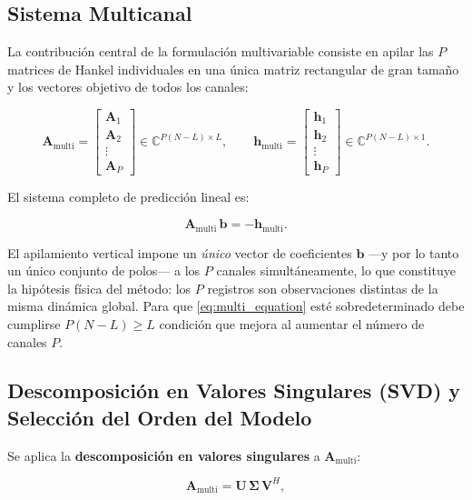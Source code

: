 \subsection{Sistema  Multicanal}
\label{subsec:Sis_Mul}
La contribución central de la formulación multivariable consiste en apilar las 
$P$ matrices de Hankel individuales en una única matriz rectangular de gran tamaño y
los vectores objetivo de todos los canales:

\begin{equation}
\mathbf{A}_{\text{multi}} =
\begin{bmatrix} \mathbf{A}_1 \\ \mathbf{A}_2 \\ \vdots \\ \mathbf{A}_P \end{bmatrix}
\in \mathbb{C}^{P(N-L)\times L},
\qquad
\mathbf{h}_{\text{multi}} =
\begin{bmatrix} \mathbf{h}_1 \\ \mathbf{h}_2 \\ \vdots \\ \mathbf{h}_P \end{bmatrix}
\in \mathbb{C}^{P(N-L)\times 1}.
\label{eq:multi_system}
\end{equation}

El sistema completo de predicción lineal es:

\begin{equation}
\boxed{\mathbf{A}_{\text{multi}}\,\mathbf{b} = -\mathbf{h}_{\text{multi}}}.
\label{eq:multi_equation}
\end{equation}

El apilamiento vertical impone un \textit{único} vector de coeficientes $\mathbf{b}$ 
---y por lo tanto un único conjunto de polos--- a los $P$ canales simultáneamente, lo 
que constituye la hipótesis física del método: los $P$ registros son observaciones 
distintas de la misma dinámica global. Para que \eqref{eq:multi_equation} esté 
sobredeterminado debe cumplirse $P(N-L) \geq L$ condición que mejora al aumentar el 
número de canales $P$. 


\subsection{Descomposición en Valores Singulares (SVD) y Selección del Orden del Modelo}

Se aplica la \textbf{descomposición en valores singulares} a $\mathbf{A}_{\text{multi}}$:

\begin{equation}
\mathbf{A}_{\text{multi}} = \mathbf{U}\,\boldsymbol{\Sigma}\,\mathbf{V}^H,
\label{eq:svd}
\end{equation}

